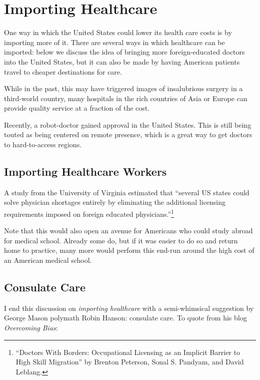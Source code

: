 \section{Importing Healthcare}

One way in which the United States could lower its health care costs is by
importing more of it. There are several ways in which healthcare can be
imported: below we discuss the idea of bringing more foreign-educated doctors
into the United States, but it can also be made by having American patients
travel to cheaper destinations for care.

While in the past, this may have triggered images of insalubrious surgery in a
third-world country, many hospitals in the rich countries of Asia or Europe can
provide quality service at a fraction of the cost.

Recently, a robot-doctor gained approval in the United States. This is still
being touted as being centered on remote presence, which is a great way to get
doctors to hard-to-access regions.


\subsection{Importing Healthcare Workers}

A study from the University of Virginia estimated that ``several US states
could solve physician shortages entirely by eliminating the additional
licensing requirements imposed on foreign educated
physicians.''\footnote{``Doctors With Borders: Occupational Licensing as an
Implicit Barrier to High Skill Migration'' by Brenton Peterson, Sonal S.
Pandyam, and David Leblang.}

Note that this would also open an avenue for Americans who could study abroad
for medical school. Already some do, but if it was easier to do so and return
home to practice, many more would perform this end-run around the high cost of
an American medical school.

\subsection{Consulate Care}

I end this discussion on \emph{importing healthcare} with a semi-whimsical
suggestion by George Mason polymath Robin Hanson: consulate care. To quote from
his blog \emph{Overcoming Bias}:

